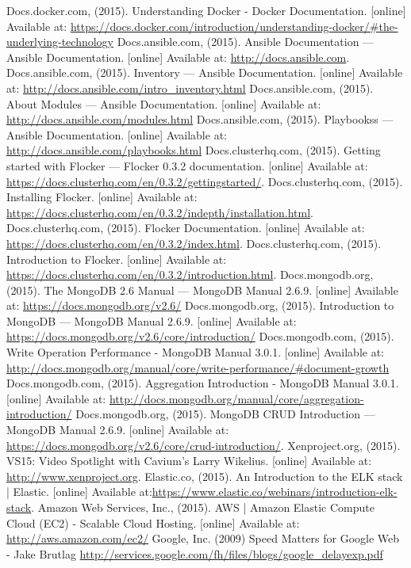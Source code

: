 \documentclass{article}
\begin{document}
\begin{thebibliography}{99}
Docs.docker.com, (2015). Understanding Docker - Docker Documentation. [online] Available at: \url{https://docs.docker.com/introduction/understanding-docker/#the-underlying-technology}
Docs.ansible.com, (2015). Ansible Documentation — Ansible Documentation. [online] Available at:
\url{http://docs.ansible.com}.
Docs.ansible.com, (2015). Inventory — Ansible Documentation. [online] Available at: \url{http://docs.ansible.com/intro_inventory.html}
Docs.ansible.com, (2015). About Modules — Ansible Documentation. [online] Available at: \url{http://docs.ansible.com/modules.html}
Docs.ansible.com, (2015). Playbookss — Ansible Documentation. [online] Available at: \url{http://docs.ansible.com/playbooks.html}
Docs.clusterhq.com, (2015). Getting started with Flocker — Flocker 0.3.2 documentation. [online] Available at: \url{https://docs.clusterhq.com/en/0.3.2/gettingstarted/}.
Docs.clusterhq.com, (2015). Installing Flocker. [online] Available at: \url{https://docs.clusterhq.com/en/0.3.2/indepth/installation.html}.
Docs.clusterhq.com, (2015). Flocker Documentation. [online] Available at: \url{https://docs.clusterhq.com/en/0.3.2/index.html}.
Docs.clusterhq.com, (2015). Introduction to Flocker. [online] Available at: \url{https://docs.clusterhq.com/en/0.3.2/introduction.html}.
Docs.mongodb.org, (2015). The MongoDB 2.6 Manual — MongoDB Manual 2.6.9. [online] Available at: \url{https://docs.mongodb.org/v2.6/}
Docs.mongodb.org, (2015). Introduction to MongoDB — MongoDB Manual 2.6.9. [online] Available at: \url{https://docs.mongodb.org/v2.6/core/introduction/}
Docs.mongodb.com, (2015). Write Operation Performance - MongoDB Manual 3.0.1. [online] Available at: \url{http://docs.mongodb.org/manual/core/write-performance/#document-growth}
Docs.mongodb.com, (2015). Aggregation Introduction - MongoDB Manual 3.0.1. [online] Available at: \url{http://docs.mongodb.org/manual/core/aggregation-introduction/}
Docs.mongodb.org, (2015). MongoDB CRUD Introduction — MongoDB Manual 2.6.9. [online] Available at: \url{https://docs.mongodb.org/v2.6/core/crud-introduction/}.
Xenproject.org, (2015). VS15: Video Spotlight with Cavium's Larry Wikelius. [online] Available at: \url{http://www.xenproject.org}.
Elastic.co, (2015). An Introduction to the ELK stack | Elastic. [online] Available at:\url{https://www.elastic.co/webinars/introduction-elk-stack}.
Amazon Web Services, Inc., (2015). AWS | Amazon Elastic Compute Cloud (EC2) - Scalable Cloud Hosting. [online] Available at: \url{http://aws.amazon.com/ec2/}
Google, Inc. (2009) Speed Matters for Google Web - Jake Brutlag \url{http://services.google.com/fh/files/blogs/google_delayexp.pdf}
\end{thebibliography}
\end{document}
